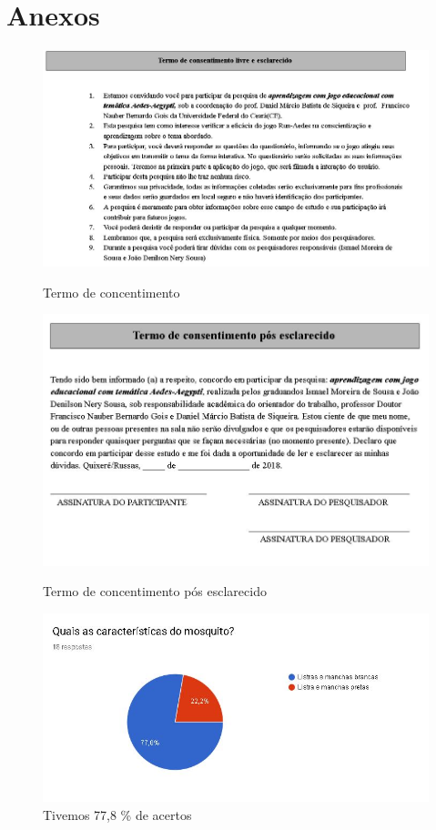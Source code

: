 \documentclass[12pt]{article}
\begin{document}
	\section{Anexos} 
	\begin{figure}[H]
		\centering
		\caption{Termo de concentimento}
		\includegraphics[width=0.7\linewidth]{"Figuras/Figure_1"}
		\label{fig:termo-de-concentimento}
	\end{figure}

	\begin{figure}[H]
		\centering
		\caption{Termo de concentimento pós esclarecido}
		\includegraphics[width=0.7\linewidth]{"Figuras/Figure_2"}
		\label{fig:termo-de-concentimento-pos-esclarecido}
	\end{figure}
	
	\begin{figure}[H]
		\centering
		\caption{Tivemos 77,8 \% de acertos}
		\includegraphics[width=0.7\linewidth]{Figuras/Pergunta_1}
		
		\label{fig:pergunta1}
	\end{figure}
	
\end{document}
